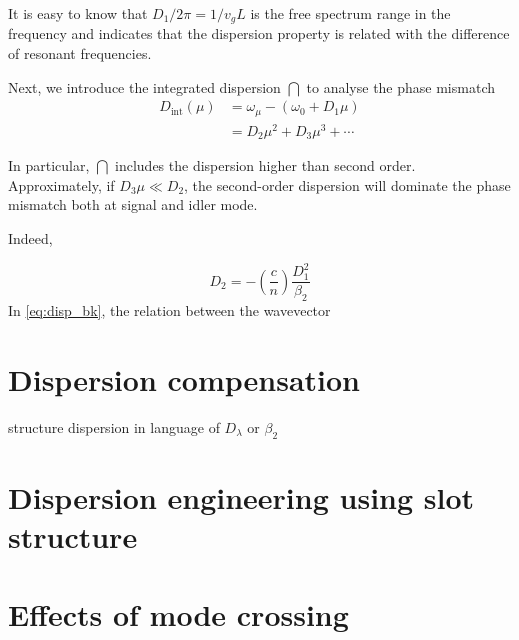 It is easy to know that $D_1 / 2 \pi = 1 / v_g L$ is the free spectrum range in the frequency and indicates that the dispersion property is related with the difference of resonant frequencies.   

Next, we introduce the integrated dispersion $\dint$ \cite{Brasch2014a} to analyse the phase mismatch
\begin{align}\label{eq:def-dint}
    D_\mathrm{int}(\mu) &= \omega_{\mu} - (\omega_0 + D_1 \mu)  \\
    &= D_2 \mu^2 + D_3 \mu^3 + \cdots \nonumber
\end{align}

In particular, $\dint$ includes the dispersion higher than second order. Approximately, if $D_3 \mu \ll D_2$, the second-order dispersion will dominate the phase mismatch both at signal and idler mode.

Indeed, 

\begin{equation}
    D_2 = -(\frac{c}{n})\frac{D_1^2}{\beta_2}
\end{equation}
In \autoref{eq:disp_bk}, the relation between the wavevector 

\section{Dispersion compensation}
structure dispersion
in language of $D_\lambda$ or $\beta_2$
\section{Dispersion engineering using slot structure}

\section{Effects of mode crossing}
